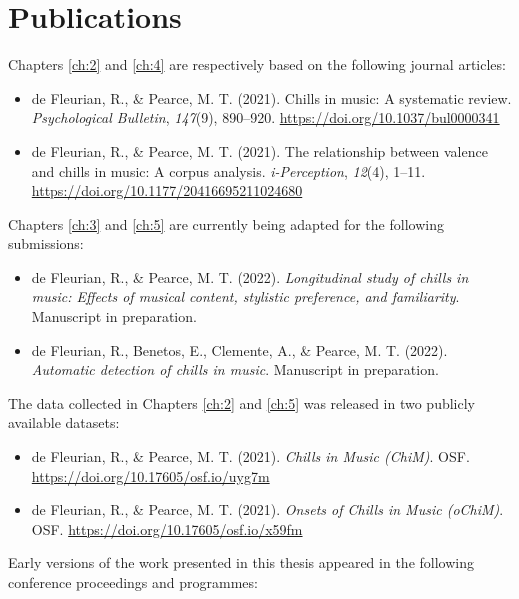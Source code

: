 
\chapter*{Publications}

Chapters \ref{ch:2} and \ref{ch:4} are respectively based on the following journal articles:

\begin{itemize}
\item de Fleurian, R., \& Pearce, M. T. (2021). Chills in music: A systematic review. \emph{Psychological Bulletin}, \emph{147}(9), 890--920. \url{https://doi.org/10.1037/bul0000341}
\item de Fleurian, R., \& Pearce, M. T. (2021). The relationship between valence and chills in music: A corpus analysis. \emph{i-Perception}, \emph{12}(4), 1--11. \url{https://doi.org/10.1177/20416695211024680}
\end{itemize}

\noindent Chapters \ref{ch:3} and \ref{ch:5} are currently being adapted for the following submissions:

\begin{itemize}
\item de Fleurian, R., \& Pearce, M. T. (2022). \emph{Longitudinal study of chills in music: Effects of musical content, stylistic preference, and familiarity}. Manuscript in preparation.
\item de Fleurian, R., Benetos, E., Clemente, A., \& Pearce, M. T. (2022). \emph{Automatic detection of chills in music}. Manuscript in preparation.
\end{itemize}

\noindent The data collected in Chapters \ref{ch:2} and \ref{ch:5} was released in two publicly available datasets:

\begin{itemize}
\item de Fleurian, R., \& Pearce, M. T. (2021). \emph{Chills in Music (ChiM)}. OSF. \url{https://doi.org/10.17605/osf.io/uyg7m}
\item de Fleurian, R., \& Pearce, M. T. (2021). \emph{Onsets of Chills in Music (oChiM)}. OSF. \url{https://doi.org/10.17605/osf.io/x59fm}
\end{itemize}

\noindent Early versions of the work presented in this thesis appeared in the following conference proceedings and programmes:

